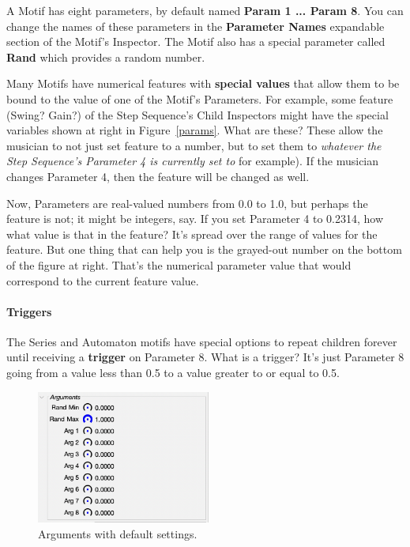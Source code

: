 \documentclass[twoside,10pt]{article}
\begin{document}
A Motif has eight parameters, by default named {\bf Param 1 ... Param 8}.  You can change the names of these parameters in the {\bf Parameter Names} expandable section of the Motif's Inspector.  The Motif also has a special parameter called {\bf Rand} which provides a random number.

Many Motifs have numerical features with {\bf special values} that allow them to be bound to the value of one of the Motif's Parameters.  For example, some feature (Swing?  Gain?) of the Step Sequence's Child Inspectors might have the special variables shown at right in Figure~\ref{params}.  What are these?  These allow the musician to not just set feature to a number, but to set them to {\it whatever the Step Sequence's Parameter 4 is currently set to} for example).  If the musician changes Parameter 4, then the feature will be changed as well.

Now, Parameters are real-valued numbers from 0.0 to 1.0, but perhaps the feature is not; it might be integers, say.  If you set Parameter 4 to 0.2314, how what value is that in the feature?  It's spread over the range of values for the feature.  But one thing that can help you is the grayed-out number on the bottom of the figure at right.  That's the numerical parameter value that would correspond to the current feature value.  

\paragraph{Triggers} The Series and Automaton motifs have special options to repeat children forever until receiving a {\bf trigger} on Parameter 8.  What is a trigger?  It's just Parameter 8 going from a value less than 0.5 to a value greater to or equal to 0.5.  

\begin{figure}
\vspace{-1em}
\includegraphics[width=2.25in]{arguments}
\caption{Arguments with default settings.}
\label{arguments}
\end{figure}
\end{document}

